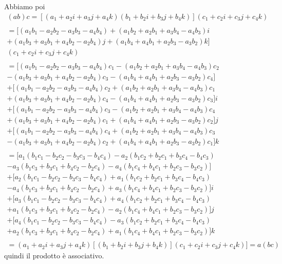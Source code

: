 \documentclass[a4paper,11pt]{article}
\begin{document}
Abbiamo poi
\begin{eqnarray*}
	(a b) c  = [(a_1 + a_2 i + a_3 j + a_4 k) (b_1 + b_2 i + b_3 j + b_4 k)] (c_1 + c_2 i + c_3 j + c_4 k)
\\
\\
	= [(a_1 b_1 - a_2 b_2 - a_3 b_3  - a_4 b_4)  + (a_1 b_2 + a_2 b_1 + a_3 b_4 - a_4 b_3) i
\\
	+ (a_1 b_3 + a_3 b_1 + a_4 b_2 - a_2 b_4) j + (a_1 b_4 + a_4 b_1 + a_2 b_3 - a_3 b_2) k]
\\
	(c_1 + c_2 i + c_3 j + c_4 k)
\\
\\
	= [(a_1 b_1 - a_2 b_2 - a_3 b_3  - a_4 b_4) c_1  - (a_1 b_2 + a_2 b_1 + a_3 b_4 - a_4 b_3) c_2
\\
	- (a_1 b_3 + a_3 b_1 + a_4 b_2 - a_2 b_4) c_3 - (a_1 b_4 + a_4 b_1 + a_2 b_3 - a_3 b_2) c_4]
\\
	+ [(a_1 b_1 - a_2 b_2 - a_3 b_3  - a_4 b_4) c_2 + (a_1 b_2 + a_2 b_1 + a_3 b_4 - a_4 b_3) c_1
\\
	+(a_1 b_3 + a_3 b_1 + a_4 b_2 - a_2 b_4) c_4 -  (a_1 b_4 + a_4 b_1 + a_2 b_3 - a_3 b_2) c_3] i
\\
	+ [(a_1 b_1 - a_2 b_2 - a_3 b_3  - a_4 b_4) c_3 - (a_1 b_2 + a_2 b_1 + a_3 b_4 - a_4 b_3) c_4
\\
	+(a_1 b_3 + a_3 b_1 + a_4 b_2 - a_2 b_4) c_1 +  (a_1 b_4 + a_4 b_1 + a_2 b_3 - a_3 b_2) c_2] j
\\
	+ [(a_1 b_1 - a_2 b_2 - a_3 b_3  - a_4 b_4) c_4 + (a_1 b_2 + a_2 b_1 + a_3 b_4 - a_4 b_3) c_3
\\
	-(a_1 b_3 + a_3 b_1 + a_4 b_2 - a_2 b_4) c_2 +  (a_1 b_4 + a_4 b_1 + a_2 b_3 - a_3 b_2) c_1] k
\\
\\
	= [a_1 (b_1 c_1 -b_2 c_2- b_3 c_3 - b_4 c_4) - a_2 (b_1 c_2 + b_2 c_1 + b_3 c_4 - b_4 c_3)
\\
	- a_3 (b_1 c_3 + b_3 c_1 + b_4 c_2 - b_2 c_4) - a_4 (b_1 c_4 + b_4 c_1 + b_2 c_3 - b_3 c_2)]
\\
	+ [a_2 (b_1 c_1 -b_2 c_2- b_3 c_3 - b_4 c_4) + a_1 (b_1 c_2 + b_2 c_1 + b_3 c_4 - b_4 c_3)
\\
	- a_4 (b_1 c_3 + b_3 c_1 + b_4 c_2 - b_2 c_4) + a_3 (b_1 c_4 + b_4 c_1 + b_2 c_3 - b_3 c_2)] i
\\
	+ [a_3 (b_1 c_1 -b_2 c_2- b_3 c_3 - b_4 c_4) + a_4 (b_1 c_2 + b_2 c_1 + b_3 c_4 - b_4 c_3)
\\
	+ a_1 (b_1 c_3 + b_3 c_1 + b_4 c_2 - b_2 c_4) - a_2  (b_1 c_4 + b_4 c_1 + b_2 c_3 - b_3 c_2)] j
\\
	+ [a_4 (b_1 c_1 -b_2 c_2- b_3 c_3 - b_4 c_4) - a_3 (b_1 c_2 + b_2 c_1 + b_3 c_4 - b_4 c_3)
\\
	+ a_2 (b_1 c_3 + b_3 c_1 + b_4 c_2 - b_2 c_4) + a_1  (b_1 c_4 + b_4 c_1 + b_2 c_3 - b_3 c_2)] k
\\
\\
	= (a_1 + a_2 i + a_3 j + a_4 k) [(b_1 + b_2 i + b_3 j + b_4 k)] (c_1 + c_2 i + c_3 j + c_4 k)]  = a (b c)
\end{eqnarray*}
quindi il prodotto è associativo.
\end{document}
